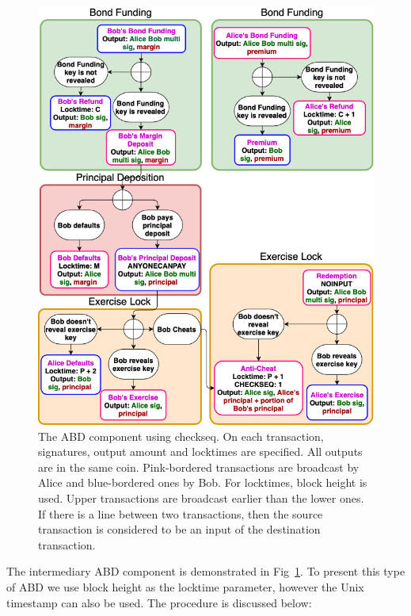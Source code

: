 \begin{figure}[h]
  \centering
  \includegraphics[width=\linewidth]{figures/bond-second.png}
  \caption{The ABD component using checkseq. On each transaction, signatures, output amount and locktimes are specified. All outputs are in the same coin. Pink-bordered transactions are broadcast by Alice and blue-bordered ones by Bob. For locktimes, block height is used. Upper transactions are broadcast earlier than the lower ones. If there is a line between two transactions, then the source transaction is considered to be an input of the destination transaction.}
  \label{fig:non-collat-bond}
\end{figure}

The intermediary ABD component is demonstrated in Fig~\ref{fig:non-collat-bond}. To present this type of ABD we use block height as the locktime parameter, however the Unix timestamp can also be used. The procedure is discussed below:


